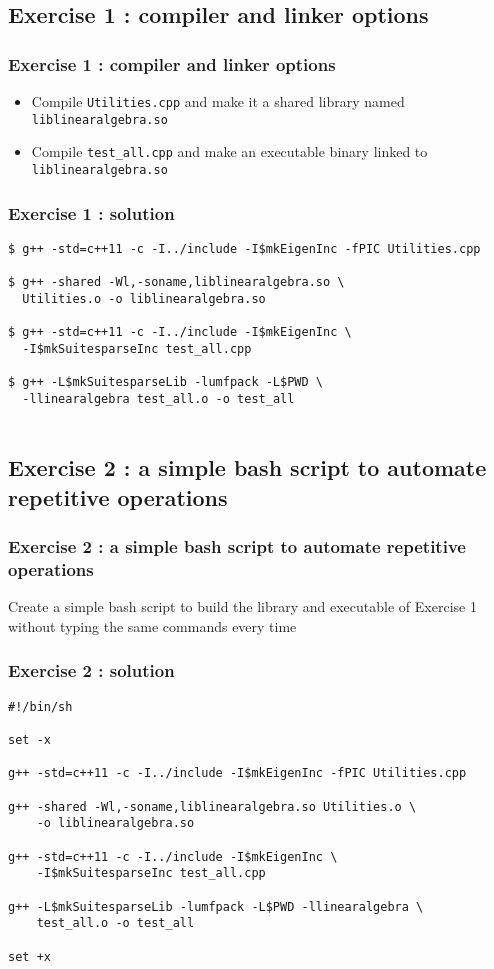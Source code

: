 \documentclass[9pt]{beamer}
\begin{document}
\subsection{Exercise 1 : compiler and linker options}
\begin{frame}\frametitle{Exercise 1 : compiler and linker options}
\begin{itemize}
\item Compile {\tt Utilities.cpp} and make it a shared library named {\tt liblinearalgebra.so}\\[5mm]
\item Compile {\tt test\_all.cpp} and make an executable binary linked to {\tt liblinearalgebra.so}
\end{itemize}
\end{frame}

\begin{frame}[fragile]\frametitle{Exercise 1 : solution}
\begin{verbatim}
$ g++ -std=c++11 -c -I../include -I$mkEigenInc -fPIC Utilities.cpp

$ g++ -shared -Wl,-soname,liblinearalgebra.so \
  Utilities.o -o liblinearalgebra.so
  
$ g++ -std=c++11 -c -I../include -I$mkEigenInc \
  -I$mkSuitesparseInc test_all.cpp
  
$ g++ -L$mkSuitesparseLib -lumfpack -L$PWD \
  -llinearalgebra test_all.o -o test_all
  
\end{verbatim}


\end{frame}



\subsection{Exercise 2 : a simple bash script to automate repetitive operations}
\begin{frame}\frametitle{Exercise 2 : a simple bash script to automate repetitive operations}
Create a simple bash script to build the library and executable of Exercise 1 without typing the same commands every time
\end{frame}

\begin{frame}[fragile]\frametitle{Exercise 2 : solution}
\begin{verbatim}
#!/bin/sh

set -x

g++ -std=c++11 -c -I../include -I$mkEigenInc -fPIC Utilities.cpp

g++ -shared -Wl,-soname,liblinearalgebra.so Utilities.o \
    -o liblinearalgebra.so
    
g++ -std=c++11 -c -I../include -I$mkEigenInc \
    -I$mkSuitesparseInc test_all.cpp
    
g++ -L$mkSuitesparseLib -lumfpack -L$PWD -llinearalgebra \
    test_all.o -o test_all

set +x
\end{verbatim}
\end{frame}
\end{document}
